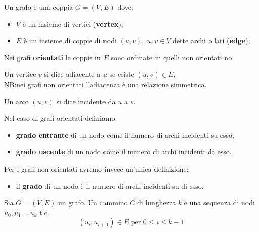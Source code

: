 
\begin{definizione}[Grafo]
    Un grafo è una coppia \(G=(V,E)\) dove:
    \begin{itemize}
        \item \(V\) è un insieme di vertici (\textbf{vertex});
        \item \(E\) è un insieme di coppie di nodi \((u,v),\;u,v\in V\) dette archi o lati (\textbf{edge});
    \end{itemize}
    Nei grafi \textbf{orientati} le coppie in \(E\) sono ordinate in quelli non orientati no.
\end{definizione}

\begin{definizione}[Adiacenza]
Un vertice \(v\) si dice adiacente a \(u\) se esiste \((u,v) \in E\). \\
NB:\@ nei grafi non orientati l'adiacenza è una relazione simmetrica.
\end{definizione}

\begin{definizione}[Incidente]
    Un arco \((u,v)\) si dice incidente da \(u\) a \(v\).
\end{definizione}

\begin{definizione}[Grado]
    Nel caso di grafi orientati definiamo:
    \begin{itemize}
        \item \textbf{grado entrante} di un nodo come il numero di archi incidenti su esso;
        \item \textbf{grado uscente} di un nodo come il numero di archi incidenti da esso.
    \end{itemize}
    Per i grafi non orientati avremo invece un'unica definizione:
    \begin{itemize}
        \item il \textbf{grado} di un nodo è il numero di archi incidenti su di esso. 
    \end{itemize}
\end{definizione}

\begin{definizione}[Cammino]
    Sia \(G=(V,E)\) un grafo. Un cammino \(C\) di lunghezza \(k\) è una sequenza di nodi \(u_0,u_1 \dots, u_k\) t.c. 
    \begin{equation}
        (u_i,u_{i+1})\in E \text{ per } 0 \leq i \leq k-1
    \end{equation}
\end{definizione}

